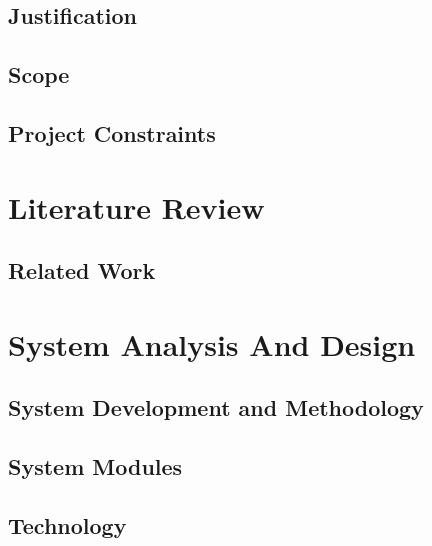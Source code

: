 \documentclass{report}
\begin{document}
\section{Justification}


\section{Scope}


\section{Project Constraints}



\chapter{Literature Review}

\section{Related Work}


\chapter{System Analysis And Design}

\section{System Development and Methodology}


\section{System Modules}


\section{Technology}






\nocite{*}



\end{document}
